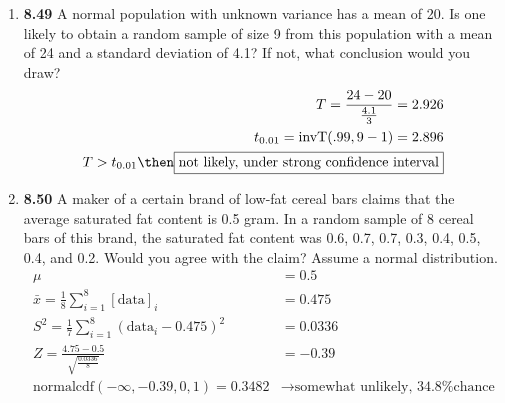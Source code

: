 \documentclass[basic, header]{nosvagor-notes}
\begin{document}
\begin{enumerate}[itemsep=2em]
\begin{enumerate}
    \end{enumerate}

  \newpage %

  \item \textbf{8.49} A normal population with unknown variance has a mean of
    20. Is one likely to obtain a random sample of size 9 from this population
    with a mean of 24 and a standard deviation of 4.1? If not, what conclusion
    would you draw?
    \begin{align*}
      T = \frac{24 - 20}{\frac{4.1}{3}} = 2.926 \\
      t_{0.01} = \text{invT}(.99, 9-1) = 2.896 \\
      T > t_{0.01} \then \boxed{\text{not likely, under strong confidence interval}}
    \end{align*}


  \item \textbf{8.50} A maker of a certain brand of low-fat cereal bars claims that the
    average saturated fat content is 0.5 gram. In a random sample of 8 cereal
    bars of this brand, the saturated fat content was 0.6, 0.7, 0.7, 0.3, 0.4,
    0.5, 0.4, and 0.2. Would you agree with the claim? Assume a normal
    distribution.
    \begin{align*}
      \mu &= 0.5 \\
      \bar{x} = \frac{1}{8} \sum_{i=1}^{8} [\text{data}]_i
      &= 0.475 \\
      S^2 = \frac{1}{7} \sum_{i=1}^{8} \left( \text{data}_i - 0.475 \right)^2
      &= 0.0336 \\
      Z = \frac{4.75 - 0.5 }{\sqrt{\frac{0.0336}{8}}}
      &= -0.39 \\
      \text{normalcdf}(-\infty, -0.39,0,1) = 0.3482
      &\to \boxed{\text{somewhat unlikely, 34.8\% chance}}
    \end{align*}

\end{enumerate}
\end{document}
